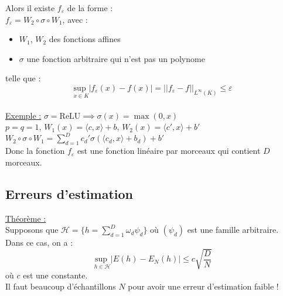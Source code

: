 \documentclass[12pt,a4paper]{article}
\begin{document}
Alors il existe $f_{\varepsilon}$ de la forme :\\
$f_{\varepsilon} = W_2 \circ \sigma \circ W_1$, avec :
\begin{itemize}
    \item $W_1$, $W_2$ des fonctions affines
    \item $\sigma$ une fonction arbitraire qui n'est pas un polynome
\end{itemize}

telle que :
$$
\underset{x \in K}{\text{sup }} |f_{\varepsilon}(x) - f(x)| = ||f_{\varepsilon} - f||_{L^{\infty}(K)} \leq \varepsilon
$$\\

\underline{Exemple :}
$\sigma = \text{ReLU} \implies \sigma(x) = \max(0, x)$\\

$p = q = 1$,
$W_1(x) = \langle c, x \rangle + b$,
$W_2(x) = \langle c', x \rangle + b'$\\

$W_2 \circ \sigma \circ W_1 = \sum_{d=1}^D c_d' \sigma (\langle c_d, x \rangle + b_d) + b'$\\

Donc la fonction $f_{\varepsilon}$ est une fonction linéaire par morceaux qui contient $D$ morceaux.\\


\subsection{Erreurs d'estimation}

\underline{Théorème :}\\
Supposons que $\mathcal{H} = \{h = \sum_{d=1}^D \omega_d \psi_d\}$
où $(\psi_d)$ est une famille arbitraire.\\
Dans ce cas, on a :
$$
\underset{h \in \mathcal{H}}{\text{sup }} |E(h) - E_N(h)| \leq c\sqrt{\frac{D}{N}}
$$
où $c$ est une constante.\\

Il faut beaucoup d'échantillons $N$ pour avoir une erreur d'estimation faible !\\
\end{document}
